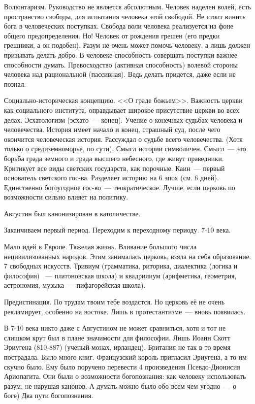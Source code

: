 Волюнтаризм. Руководство не является абсолютным. Человек наделен волей, есть пространство свободы, для испытания человека этой свободой. Не стоит винить бога в человеческих поступках. Свобода воли человека реализуется на фоне общего предопределения. Но! Человек от рождения грешен (его предки грешники, а он подобен). Разум не очень может помочь человеку, а лишь должен призывать делать добро. В человеке способность совершать поступки важнее способности думать. Превосходство (активная способность) волевой стороны человека над рациональной (пассивная). Ведь делать придется, даже если не познал.

Социально-историческая концепцию. <<О граде божьем>>. Важность церкви как социального института, оправдывает широкое присутствие церкви во всех делах. Эсхатологизм (эсхато~--- конец). Учение о конечных судьбах человека и человечества. История имеет начало и конец, страшный суд, после чего окончится человеческая история. Рассуждал о судьбе всего человечества. (Хотя только о средиземноморье, по сути). Смысл истории символичен. Смысл~--- это борьба града земного и града высшего небесного, где живут праведники. Критикует все виды светских государств, как порочные. Каин~--- первый основатель светского гос-ва. Разделяет историю на 6 эпох (см. 6 дней). Единственно богоугодное гос-во~--- теократическое. Лучше, если церковь по возможности сильно влияет на политику.

Августин был канонизирован в католичестве.

Заканчиваем первый период. Переходим к переходному периоду. 7-10 века.

Мало идей в Европе. Тяжелая жизнь. Вливание большого числа нецивилизованных народов. Этим занималась церковь, взяла на себя образование. 7 свободных искусств. Тривиум (грамматика, риторика, диалектика (логика и философия) ~--- платоновская школа) и квадрилиум (арифметика, геометрия, астрономия, музыка~--- пифагорейская школа). 

Предистинация. По трудам твоим тебе воздастся. Но церковь её не очень рекламирует, особенно на востоке. Лишь в протестантизме~--- вновь появилась.

В 7-10 века никто даже с Августином не может сравниться, хотя и тот не слишком крут был в плане значимости для философии.
Лишь Иоанн Скотт Эриугена (810-887) (ученый-монах, ирландец). Британия не так в то время пострадала. Было много книг. Французский король пригласил Эриугена, а то им скучно было. Ему было поручено перевести 4 произведения Псевдо-Дионисия Ариопагита. Они были о возможности богопознания: как человеку использовать разум, не нарушая канонов. А думать можно было обо всем чем угодно~--- о боге) 
Два пути богопознания.

